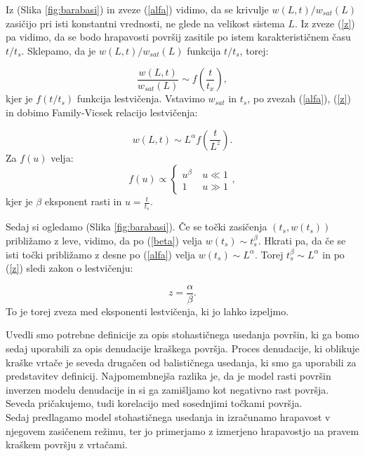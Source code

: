 \documentclass[a4paper, twoside, 12pt]{book}
\begin{document}
Iz (Slika \ref{fig:barabasi}) in zveze (\ref{alfa}) vidimo, da se krivulje $w(L,t)/w_{sat}(L)$ zasičijo pri isti konstantni vrednosti, ne glede na velikost sistema $L$. Iz zveze (\ref{z}) pa vidimo, da se bodo hrapavosti površij zasitile po istem karakterističnem času $t/t_s$. Sklepamo, da je $w(L,t)/w_{sat}(L)$ funkcija $t/t_s$, torej:

  \begin{equation}
    \frac{w(L,t)}{w_{sat}(L)} \sim f(\frac{t}{t_x}),
  \end{equation}
kjer je $f(t/t_s)$ funkcija lestvičenja. Vstavimo $w_{sat}$ in $t_s$, po zvezah (\ref{alfa}), (\ref{z}) in dobimo Family-Vicsek relacijo lestvičenja:

  \begin{equation}
    w(L,t) \sim L^\alpha f(\frac{t}{L^z}).
    \label{family-vicsek}
  \end{equation}
Za $f(u)$ velja:
  \begin{equation}
    f(u) \propto \left \{ \begin{array}{lr} u^{\beta} & \ u\ll 1 \\
      1 & \ u\gg1\end{array}, \right.
    \end{equation}
kjer je $\beta$ eksponent rasti in $u=\frac{t}{t_s}$.

Sedaj si ogledamo (Slika \ref{fig:barabasi}). Če se točki zasičenja $(t_s,w(t_s))$ približamo z leve, vidimo, da po (\ref{beta}) velja $w(t_s) \sim t_s^\beta$. Hkrati pa, da če se isti točki približamo z desne po (\ref{alfa}) velja $w(t_s) \sim L^\alpha$. Torej $t_s^\beta \sim L^\alpha$ in po (\ref{z}) sledi zakon o lestvičenju:

    \begin{equation}
      z = \frac{\alpha}{\beta}.
    \end{equation}
To je torej zveza med eksponenti lestvičenja, ki jo lahko izpeljmo.

Uvedli smo potrebne definicije za opis stohastičnega usedanja površin, ki ga bomo sedaj uporabili za opis denudacije kraškega površja. Proces denudacije, ki oblikuje kraške vrtače je seveda drugačen od balističnega usedanja, ki smo ga uporabili za predstavitev definicij. Najpomembnejša razlika je, da je model rasti površin inverzen modelu denudacije in si ga zamišljamo kot negativno rast površja. Seveda pričakujemo, tudi korelacijo med sosednjimi točkami površja. \\
Sedaj predlagamo model stohastičnega usedanja in izračunamo hrapavost v njegovem zasičenem režimu, ter jo primerjamo z izmerjeno hrapavostjo na pravem kraškem površju z vrtačami.
\end{document}
